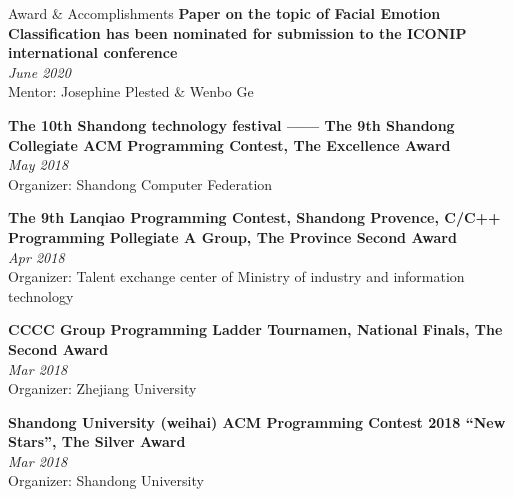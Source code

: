 \documentclass{resume} %
\begin{document}
\begin{rSection}{Award \& Accomplish­ments}
{\bf Paper on the topic of Facial Emotion Classification has been nominated for submission to the ICONIP  international conference}\\ \hfill {\em June 2020}\\
{Mentor: Josephine Plested \& Wenbo Ge}
 
{\bf The 10th Shandong technology festival —— The 9th Shandong Collegiate ACM Programming Contest, The Excellence Award}\\ \hfill {\em May 2018}\\
{Organizer: Shandong Computer Federation}

{\bf The 9th Lanqiao Programming Contest, Shandong Provence, C/C++ Programming Pollegiate A Group, The Province Second Award}\\ \hfill {\em Apr 2018}\\
{Organizer: Talent exchange center of Ministry of industry and information technology}

{\bf CCCC Group Programming Ladder Tournamen, National Finals, The Second Award}\\ \hfill {\em Mar 2018}\\
{Organizer: Zhejiang University}

{\bf Shandong University (weihai) ACM Programming Contest 2018 “New Stars”, The Silver Award}\\ \hfill {\em Mar 2018}\\
{Organizer: Shandong University}

\end{rSection}
\end{document}
